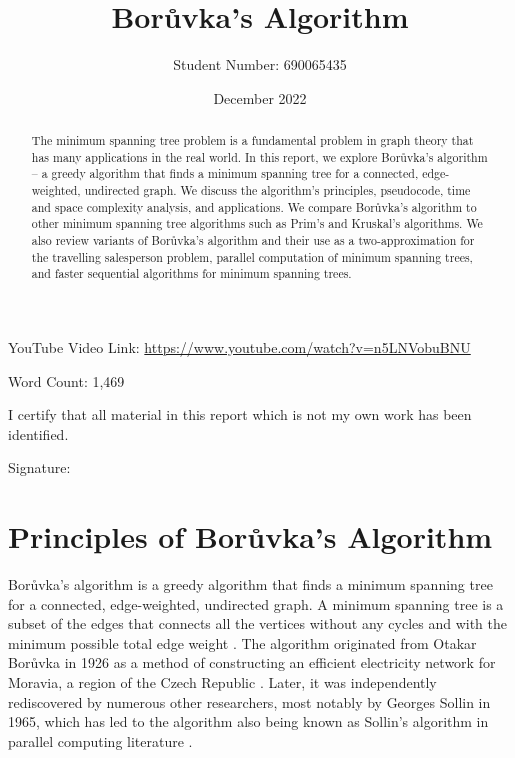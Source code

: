 \documentclass[a4paper, 11pt]{article}
\begin{document}
\title{Borůvka's Algorithm}
\author{Student Number: 690065435}
\date{December 2022}

\maketitle

\begin{abstract}
The minimum spanning tree problem is a fundamental problem in graph theory that has many applications in the real world. In this report, we explore Borůvka's algorithm -- a greedy algorithm that finds a minimum spanning tree for a connected, edge-weighted, undirected graph. We discuss the algorithm's principles, pseudocode, time and space complexity analysis, and applications. We compare Borůvka's algorithm to other minimum spanning tree algorithms such as Prim's and Kruskal's algorithms. We also review variants of Borůvka's algorithm and their use as a two-approximation for the travelling salesperson problem, parallel computation of minimum spanning trees, and faster sequential algorithms for minimum spanning trees.

\begin{center}
\end{center}
\end{abstract}

\vspace*{\fill}
\begin{center}
YouTube Video Link: \url{https://www.youtube.com/watch?v=n5LNVobuBNU}

\vspace{0.5em}
Word Count: 1,469

\vspace{1em}
I certify that all material in this report which is not my own work has been identified.
\end{center}
\vspace{1em}

Signature: \hrulefill

\newpage
\section{Principles of Borůvka's Algorithm}
Borůvka's algorithm is a greedy algorithm that finds a minimum spanning tree for a connected, edge-weighted, undirected graph. A minimum spanning tree is a subset of the edges that connects all the vertices without any cycles and with the minimum possible total edge weight \cite{graham1985history}. The algorithm originated from Otakar Borůvka in 1926 as a method of constructing an efficient electricity network for Moravia, a region of the Czech Republic \cite{nevsetvril2001otakar}. Later, it was independently rediscovered by numerous other researchers, most notably by Georges Sollin in 1965, which has led to the algorithm also being known as Sollin's algorithm in parallel computing literature \cite{sollin1965trace}. 
\end{document}
